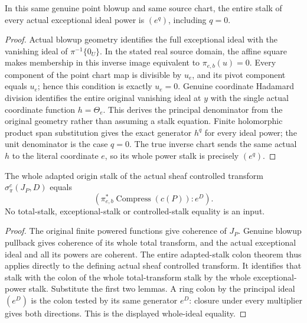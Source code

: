 \begin{lemma}
\label{hir:actual-point-chart-exceptional-power-stalk}
\leanok
In this same genuine point blowup and same source chart, the entire stalk
of every actual exceptional ideal power is $(e^q)$, including $q=0$.
\end{lemma}
\begin{proof}
Actual blowup geometry identifies the full exceptional ideal with the
vanishing ideal of $\pi^{-1}\{0_U\}$. In the stated real source domain,
the affine square makes membership in this inverse image equivalent to
$\pi_{e,b}(u)=0$. Every component of the point chart map is divisible by
$u_e$, and its pivot component equals $u_e$; hence this condition is exactly
$u_e=0$. Genuine coordinate Hadamard division identifies the entire original
vanishing ideal at $y$ with the single actual coordinate function
$h=\Theta_e$. This derives the principal denominator from the original
geometry rather than assuming a stalk equation. Finite holomorphic product
span substitution gives the exact generator $h^q$ for every ideal power;
the unit denominator is the case $q=0$. The true inverse chart sends the
same actual $h$ to the literal coordinate $e$, so its whole power stalk is
precisely $(e^q)$.
\end{proof}

\begin{theorem}
\label{hir:actual-point-weighted-controlled-stalk-colon}
\leanok
The whole adapted origin stalk of the actual sheaf controlled transform
$\sigma^c_\pi(J_P,D)$ equals
\[
 (\pi_{e,b}^*\operatorname{Compress}(c(P)):e^D).
\]
No total-stalk, exceptional-stalk or controlled-stalk equality is an input.
\end{theorem}
\begin{proof}
The original finite powered functions give coherence of $J_P$. Genuine
blowup pullback gives coherence of its whole total transform, and the
actual exceptional ideal and all its powers are coherent. The entire
adapted-stalk colon theorem thus applies directly to the defining actual
sheaf controlled transform. It identifies that stalk with the colon of the
whole total-transform stalk by the whole exceptional-power stalk. Substitute
the first two lemmas. A ring colon by the principal ideal $(e^D)$ is the
colon tested by its same generator $e^D$: closure under every multiplier
gives both directions. This is the displayed whole-ideal equality.
\end{proof}

